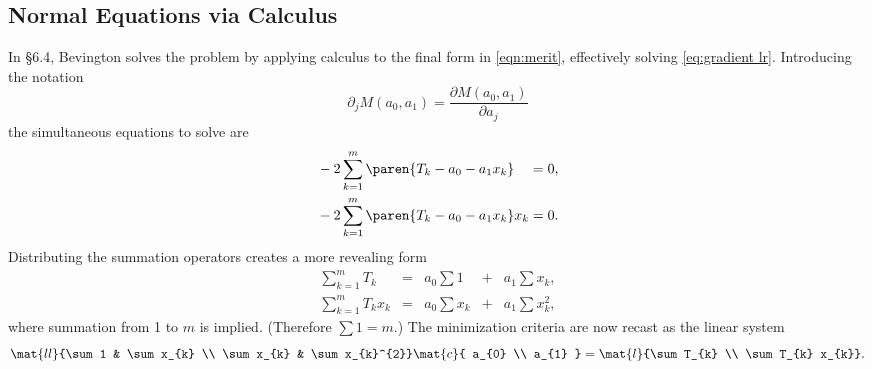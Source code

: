 \subsection{\label{ssec:Normal Equations via Calculus}Normal Equations via Calculus}  %
In \S 6.4, Bevington solves the problem by applying calculus to the final form in \eqref{eqn:merit}, effectively solving \eqref{eq:gradient lr}. Introducing the notation
  \begin{equation*}   %
       \partial_{j} M (a_{0}, a_{1}) = \frac{\partial M(a_{0}, a_{1})}{\partial a_{j}}
  \end{equation*}
the simultaneous equations to solve are
\begin{equation*}
  \begin{split}
    &-2 \sum_{k=1}^{m} \paren{T_{k} - a_{0} - a_{1}x_{k}} \phantom{x_{k}} = 0, \\
    &-2 \sum_{k=1}^{m} \paren{T_{k} - a_{0} - a_{1}x_{k}} x_{k}  = 0.
  \end{split}
\end{equation*}
Distributing the summation operators creates a more revealing form  \\[-5pt]
  \begin{equation*}   %
  \begin{array}{lclclcl}
    \sum\limits_{k=1}^{m} T_{k}       & = & a_{0} \sum 1     & + & a_{1} \sum x_{k}, \\
    \sum\limits_{k=1}^{m} T_{k} x_{k} & = & a_{0} \sum x_{k} & + & a_{1} \sum x_{k}^{2}, 
  \end{array}
  \end{equation*}
where summation from 1 to $m$ is implied. (Therefore $\sum 1 = m$.) The minimization criteria are
now recast as the linear system
  \begin{equation}   %
      \mat{ll}{\sum 1 & \sum x_{k} \\ \sum x_{k} & \sum x_{k}^{2}}
      \mat{c}{ a_{0} \\ a_{1} } = 
      \mat{l}{\sum T_{k} \\ \sum T_{k} x_{k}}.
    \label{eq:modal matrix eq}
  \end{equation}

